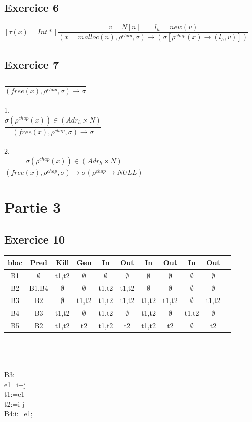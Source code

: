 \documentclass[10pt,a4paper]{article}
\begin{document}
\subsection{Exercice 6}

$ [\tau(x)=Int*] \dfrac{v=N[n] \qquad l_h = new(v)}{(x=malloc(n),\rho^{chap},\sigma) \rightarrow (\sigma[\rho^{chap}(x) \rightarrow (l_h,v)])}$
\subsection{Exercice 7}
$\dfrac{}{(free(x),\rho^{chap},\sigma) \rightarrow \sigma}$
\\\\
1.\\
$\dfrac{\sigma(\rho^{chap}( x))\in (Adr_h \times N)}
{(free(x),\rho^{chap},\sigma) \rightarrow \sigma}$
\\
\\
2.\\
$\dfrac{\sigma(\rho^{chap}( x))\in (Adr_h \times N)}
{(free(x),\rho^{chap},\sigma) \rightarrow \sigma(\rho^{chap} \rightarrow NULL)}$
\section{Partie 3}
\subsection{Exercice 10}
\begin{tabular}{|c|c|c|c|c|c|c|c|c|c|c|}
\hline 
bloc & Pred & Kill & Gen & In & Out & In & Out & In & Out \\ 
\hline 
B1 & $\emptyset$ & t1,t2 & $\emptyset$ & $\emptyset$ & $\emptyset$ & $\emptyset$ & $\emptyset$ & $\emptyset$ & $\emptyset$ \\ 
\hline 
B2 & B1,B4 & $\emptyset$ & $\emptyset$ & t1,t2 & t1,t2 & $\emptyset$ & $\emptyset$ & $\emptyset$ & $\emptyset$ \\ 
\hline 
B3 & B2 & $\emptyset$ & t1,t2 & t1,t2 & t1,t2 & t1,t2 & t1,t2 & $\emptyset$ & t1,t2 \\ 
\hline 
B4 & B3 & t1,t2 & $\emptyset$ & t1,t2 & $\emptyset$ & t1,t2 & $\emptyset$ & t1,t2 & $\emptyset$ \\ 
\hline 
B5 & B2 & t1,t2 & t2 & t1,t2 & t2 & t1,t2 & t2 & $\emptyset$ & t2  \\ 
\hline 
\end{tabular} 
\\
\\
\\
B3:\\
e1=i+j\\
t1:=e1\\
t2:=i-j\\
B4:i:=e1;\\
\\
\\
\end{document}
